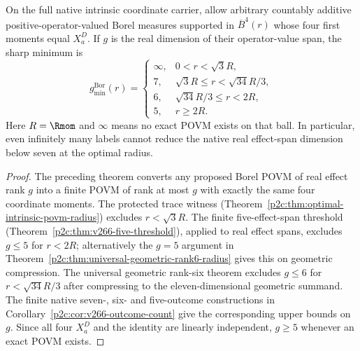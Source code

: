 \documentclass[12pt,a4paper]{article}
\begin{document}
\begin{corollary}
\label{p2c:cor:continuous-povm-effect-rank-hierarchy}
On the full native intrinsic coordinate carrier, allow arbitrary
countably additive positive-operator-valued Borel measures supported in
$\overline B^4(r)$ whose four first moments equal $X_a^D$.  If $g$ is
the real dimension of their operator-value span, the sharp minimum is
\[
 \boxed{g_{\min}^{\mathrm{Bor}}(r)=
 \begin{cases}
 \infty, & 0<r<\sqrt3R,\\
 7, & \sqrt3R\le r<\sqrt{34}R/3,\\
 6, & \sqrt{34}R/3\le r<2R,\\
 5, & r\ge2R.
 \end{cases}}
\]
Here $R=\Rmom$ and $\infty$ means no exact POVM exists on that ball.
In particular, even infinitely many labels cannot reduce the native
real effect-span dimension below seven at the optimal radius.
\end{corollary}
\begin{proof}
The preceding theorem converts any proposed Borel POVM of real effect
rank $g$ into a finite POVM of rank at most $g$ with exactly the same
four coordinate moments.  The protected trace witness
(Theorem~\ref{p2c:thm:optimal-intrinsic-povm-radius}) excludes
$r<\sqrt3R$.  The finite five-effect-span threshold
(Theorem~\ref{p2c:thm:v266-five-threshold}), applied to real effect
spans, excludes $g\le5$ for $r<2R$; alternatively the $g=5$ argument
in Theorem~\ref{p2c:thm:universal-geometric-rank6-radius} gives this
on geometric compression.  The universal geometric
rank-six theorem excludes $g\le6$ for $r<\sqrt{34}R/3$ after
compressing to the eleven-dimensional geometric summand.
The finite native seven-, six- and five-outcome constructions in
Corollary~\ref{p2c:cor:v266-outcome-count} give the corresponding
upper bounds on $g$.  Since all four $X_a^D$ and the identity are
linearly independent, $g\ge5$ whenever an exact POVM exists.
\end{proof}
\end{document}
